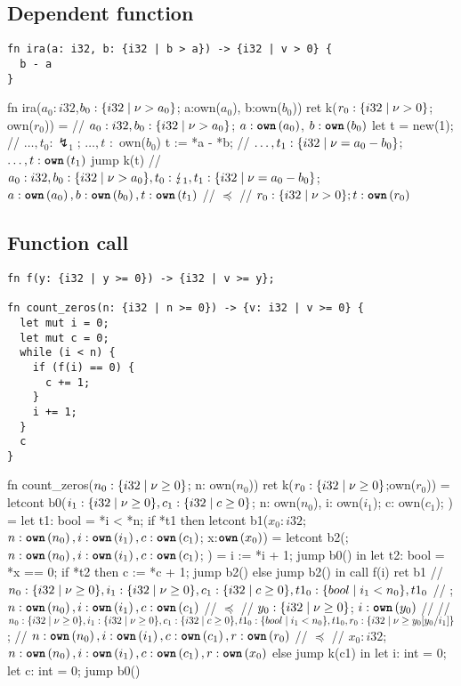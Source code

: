 \documentclass{article}
\begin{document}
\clearpage
\subsection{Dependent function}

\begin{verbatim}
fn ira(a: i32, b: {i32 | b > a}) -> {i32 | v > 0} {
  b - a
}
\end{verbatim}

\begin{lambdalr}
fn ira($a_0: i32$,$b_0:\r{i32|\nu>a_0}$; a:own($a_0$), b:own($b_0$)) ret k($r_0:\r{i32 | \nu>0}$; own($r_0$)) =
  // $a_0: i32,b_0:\r{i32 | \nu > a_0}$; $a : \text{\ttfamily \bfseries own}\left(a_0\right)$, $b : \text{\ttfamily \bfseries own}\left(b_0\right)$
  let t = new(1);  // $\dots,t_0: \lightning_1$; $\dots,t$ $:$ own($b_0$)
  t := *a - *b;    // $\dots,t_1: \r{i32 | \nu = a_0 - b_0}$; $\dots,t : \text{\ttfamily \bfseries own}\left(t_1\right)$
  jump k(t) // $a_0: i32, b_0: \r{i32 | \nu > a_0}, t_0: \lightning_1,t_1: \r{i32 | \nu = a_0 - b_0}$;$a: \text{\ttfamily \bfseries own}\left(a_0\right), b: \text{\ttfamily \bfseries own}\left(b_0\right), t: \text{\ttfamily \bfseries own}\left(t_1\right)$
            // $\preceq$
            // $r_0:\r{i32 | \nu > 0}; t:\own{r_0}$
\end{lambdalr}

\subsection{Function call}

\begin{verbatim}
fn f(y: {i32 | y >= 0}) -> {i32 | v >= y};

fn count_zeros(n: {i32 | n >= 0}) -> {v: i32 | v >= 0} {
  let mut i = 0;
  let mut c = 0;
  while (i < n) {
    if (f(i) == 0) {
      c += 1;
    }
    i += 1;
  }
  c
}
\end{verbatim}

\begin{lambdalr}
fn count_zeros($n_0: \r{i32|\nu \geq 0}$; n: own($n_0$)) ret k($r_0: \r{i32 | \nu \geq 0}$;own($r_0$)) =
  letcont b0($i_1: \r{i32| \nu \geq 0}, c_1: \r{i32 | c \geq 0}$; n: own($n_0$), i: own($i_1$); c: own($c_1$); ) =
    let t1: bool = *i < *n;
    if *t1 then
      letcont b1($x_0: i32$; $n:\text{\ttfamily \bfseries own}\left(n_0\right), i:\text{\ttfamily \bfseries own}\left(i_1\right), c:\text{\ttfamily \bfseries own}\left(c_1\right)$; x:$\text{\ttfamily \bfseries own}\left(x_0\right)$) =
        letcont b2(; $n:\text{\ttfamily \bfseries own}\left(n_0\right), i:\text{\ttfamily \bfseries own}\left(i_1\right), c:\text{\ttfamily \bfseries own}\left(c_1\right)$; ) =
          i := *i + 1;
          jump b0()
        in
        let t2: bool = *x == 0;
        if *t2 then
          c := *c + 1;
          jump b2()
        else
          jump b2()
      in
      call f(i) ret b1
        // $n_0:\r{i32|\nu\geq 0}, i_1:\r{i32|\nu\geq 0}, c_1:\r{i32|c\geq 0},t1_0:\r{bool|i_1<n_0},t1_0$
        // ;$n:\text{\ttfamily \bfseries own}\left(n_0\right),i:\text{\ttfamily \bfseries own}\left(i_1\right),c:\text{\ttfamily \bfseries own}\left(c_1\right)$
        // $\preceq$
        // $y_0: \r{i32 | \nu\geq 0}$; $i:\text{\ttfamily \bfseries own}\left(y_0\right)$
        //
        // $n_0:\r{i32|\nu\geq 0}, i_1:\r{i32|\nu\geq 0}, c_1:\r{i32|c\geq 0},t1_0:\r{bool|i_1<n_0},t1_0,r_0:\r{i32|\nu\geq y_0[y_0/i_1]}$;
        // $n:\text{\ttfamily \bfseries own}\left(n_0\right),i:\text{\ttfamily \bfseries own}\left(i_1\right),c:\text{\ttfamily \bfseries own}\left(c_1\right), r:\text{\ttfamily \bfseries own}\left(r_0\right)$
        // $\preceq$
        // $x_0: i32$; $n: \text{\ttfamily \bfseries own}\left(n_0\right), i:\text{\ttfamily \bfseries own}\left(i_1\right), c:\text{\ttfamily \bfseries own}\left(c_1\right), r:\text{\ttfamily \bfseries own}\left(x_0\right)$
    else
      jump k(c1)
  in
  let i: int = 0;
  let c: int = 0;
  jump b0()
\end{lambdalr}
\end{document}
